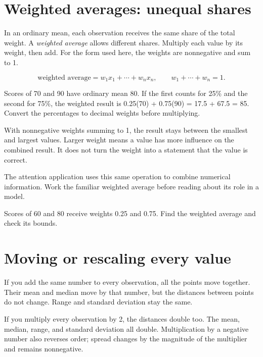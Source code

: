 

\section{Weighted averages: unequal shares}

In an ordinary mean, each observation receives the same share of the total weight. A \emph{weighted average} allows different shares. Multiply each value by its weight, then add. For the form used here, the weights are nonnegative and sum to 1.

\[\text{weighted average}=w_1x_1+\cdots+w_nx_n,\qquad w_1+\cdots+w_n=1.\]
\begin{tcolorbox}[title={Two scores with different weights},breakable]

Scores of 70 and 90 have ordinary mean 80. If the first counts for 25\% and the second for 75\%, the weighted result is 0.25(70) + 0.75(90) = 17.5 + 67.5 = 85. Convert the percentages to decimal weights before multiplying.


\end{tcolorbox}

With nonnegative weights summing to 1, the result stays between the smallest and largest values. Larger weight means a value has more influence on the combined result. It does not turn the weight into a statement that the value is correct.


The attention application uses this same operation to combine numerical information. Work the familiar weighted average before reading about its role in a model.


\begin{tcolorbox}[title={Pause and try 9},breakable]
Scores of 60 and 80 receive weights 0.25 and 0.75. Find the weighted average and check its bounds.
\end{tcolorbox}


\section{Moving or rescaling every value}

If you add the same number to every observation, all the points move together. Their mean and median move by that number, but the distances between points do not change. Range and standard deviation stay the same.


If you multiply every observation by 2, the distances double too. The mean, median, range, and standard deviation all double. Multiplication by a negative number also reverses order; spread changes by the magnitude of the multiplier and remains nonnegative.


